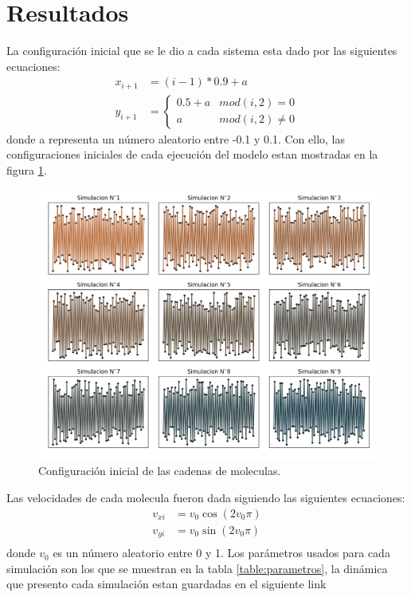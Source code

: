 \section{Resultados}
La configuración inicial que se le dio a cada sistema esta dado por las siguientes ecuaciones:
\begin{align*}
    x_{i+1}&=(i-1)*0.9+a\\
    y_{i+1}&=\left\lbrace\begin{matrix}
        0.5+a & mod(i,2)=0 \\
        a & mod(i,2)\neq 0
    \end{matrix} \right.
\end{align*}
donde a representa un número aleatorio entre -0.1 y 0.1. Con ello, las configuraciones iniciales de cada ejecución del modelo estan
mostradas en la figura \ref{fig:posini}.
\begin{figure}[H]
    \centering
    \includegraphics[scale=0.27]{../Graphics/pos_ini.png}
    \caption{Configuración inicial de las cadenas de moleculas.}
    \label{fig:posini}
\end{figure}
Las velocidades de cada molecula fueron dada siguiendo las siguientes ecuaciones:
\begin{align*}
    v_{xi}&=v_{0}\cos(2v_0\pi)\\
    v_{yi}&=v_{0}\sin(2v_0\pi)\\
\end{align*}
donde $v_0$ es un número aleatorio entre 0 y 1. Los parámetros usados para cada simulación son los que se muestran en la tabla \ref{table:parametros},
la dinámica que presento cada simulación estan guardadas en el siguiente link
